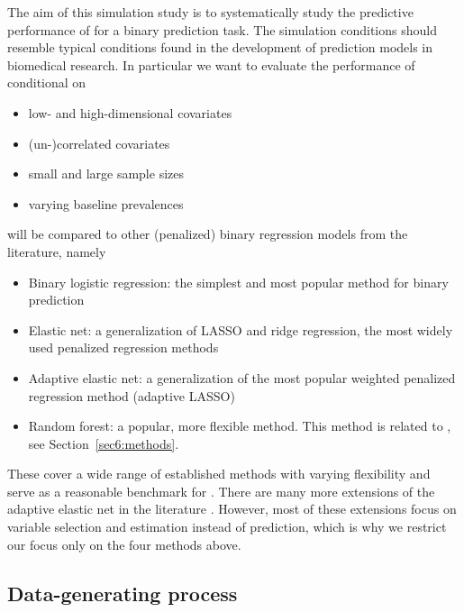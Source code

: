 \begin{subappendices}
The aim of this simulation study is to systematically study the predictive
performance of \ainet{} for a binary prediction task. The simulation conditions
should resemble typical conditions found in the development of prediction models
in biomedical research. In particular we want to evaluate the performance of
\ainet{} conditional on
\begin{itemize}
  \item low- and high-dimensional covariates
  \item (un-)correlated covariates
  \item small and large sample sizes
  \item varying baseline prevalences
\end{itemize}
\ainet{} will be compared to other (penalized) binary regression models
from the literature, namely
\begin{itemize}
  \item Binary logistic regression: the simplest and most popular method for
        binary prediction
  \item Elastic net: a generalization of LASSO and ridge regression, the most
        widely used penalized regression methods
  \item Adaptive elastic net: a generalization of the most popular weighted
  penalized regression method (adaptive LASSO)
  \item Random forest: a popular, more flexible method. This method is related to
        \ainet{}, see Section~\ref{sec6:methods}.
\end{itemize}
These cover a wide range of established methods with varying flexibility and
serve as a reasonable benchmark for \ainet. There are many more extensions of
the adaptive elastic net in the literature \citep[see \eg{} the review
by][]{Vidaurre2013}. However, most of these extensions focus on variable
selection and estimation instead of prediction, which is why we restrict our
focus only on the four methods above.

\subsection{Data-generating process} \label{sec6:dgp}


\end{subappendices}
